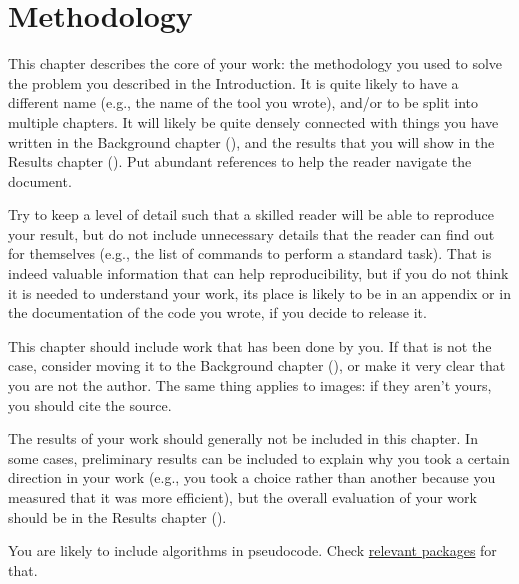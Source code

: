 \chapter{Methodology}
\label{sec:method}

This chapter describes the core of your work: the methodology you used to solve the problem
you described in the Introduction. It is quite likely to have a different name (e.g., the
name of the tool you wrote), and/or to be split into multiple chapters. It will likely be quite
densely connected with things you have written in the Background chapter (),
and the results that you will show in the Results chapter (). Put abundant
references to help the reader navigate the document.

Try to keep a level of detail such that a skilled reader will be able to reproduce your result,
but do not include unnecessary details that the reader can find out for themselves (e.g., the
list of commands to perform a standard task). That is indeed valuable information that can help
reproducibility, but if you do not think it is needed to understand your work, its place is
likely to be in an appendix or in the documentation of the code you wrote, if you decide to
release it.

This chapter should include work that has been done by you. If that is not the case, consider
moving it to the Background chapter (), or make it very clear that you are
not the author. The same thing applies to images: if they aren't yours, you should cite the
source.

The results of your work should generally not be included in this chapter. In some cases,
preliminary results can be included to explain why you took a certain direction in your work
(e.g., you took a choice rather than another because you measured that it was more efficient),
but the overall evaluation of your work should be in the Results chapter ().

You are likely to include algorithms in pseudocode. Check
\href{https://www.overleaf.com/learn/latex/Algorithms}{relevant \latex packages} for that.
